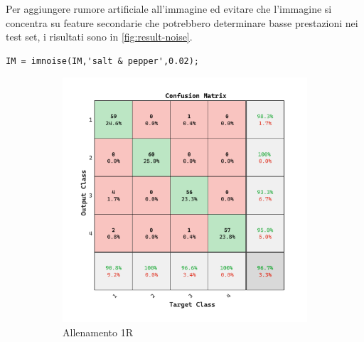 Per aggiungere rumore artificiale all'immagine ed evitare che l'immagine si concentra su feature secondarie che potrebbero determinare basse prestazioni nei test set, i risultati sono in \cref{fig:result-noise}.

\begin{lstlisting}
IM = imnoise(IM,'salt & pepper',0.02);
\end{lstlisting}

\begin{figure}[H]
    \centering
    \begin{subfigure}{0.49\textwidth}
        \includegraphics[width=\textwidth]{addestramento-rete-neurale/one-noise.pdf}
        \caption{Allenamento 1R} 
    \end{subfigure}
    \begin{subfigure}{0.49\textwidth}

\end{subfigure}
\end{figure}
